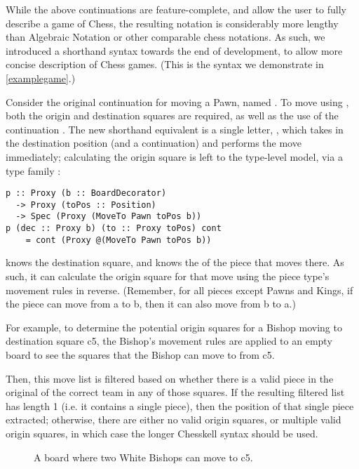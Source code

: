 While the above continuations are feature-complete, and allow the user to fully describe a game of Chess, the resulting notation is considerably more lengthy than Algebraic Notation or other comparable chess notations. As such, we introduced a shorthand syntax towards the end of development, to allow more concise description of Chess games. (This is the syntax we demonstrate in \cref{examplegame}.)

Consider the original continuation for moving a Pawn, named . To move using , both the origin and destination squares are required, as well as the use of the continuation . The new shorthand equivalent is a single letter, , which takes in the destination position (and a continuation) and performs the move immediately; calculating the origin square is left to the type-level model, via a type family :

\begin{lstlisting}
p :: Proxy (b :: BoardDecorator)
  -> Proxy (toPos :: Position)
  -> Spec (Proxy (MoveTo Pawn toPos b))
p (dec :: Proxy b) (to :: Proxy toPos) cont
    = cont (Proxy @(MoveTo Pawn toPos b))
\end{lstlisting}

 knows the destination square, and knows the  of the piece that moves there. As such, it can calculate the origin square for that move using the piece type's movement rules in reverse. (Remember, for all pieces except Pawns and Kings, if the piece can move from a to b, then it can also move from b to a.)

For example, to determine the potential origin squares for a Bishop moving to destination square c5, the Bishop's movement rules are applied to an empty board to see the squares that the Bishop can move to from c5.


Then, this move list is filtered based on whether there is a valid piece in the original  of the correct team in any of those squares. If the resulting filtered list has length 1 (i.e. it contains a single piece), then the position of that single piece extracted; otherwise, there are either no valid origin squares, or multiple valid origin squares, in which case the longer Chesskell syntax should be used.

\begin{figure}
    \centering
    \showboard
    \caption{A board where two White Bishops can move to c5.}
    \label{twobishops}
\end{figure}

